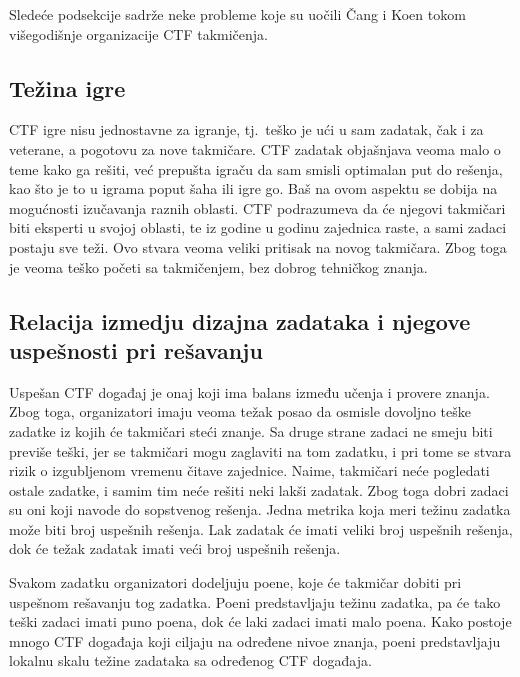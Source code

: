 \documentclass[12pt, a4paper, twocolumn]{article}
\begin{document}
Sledeće podsekcije sadrže neke probleme koje su uočili Čang i Koen 
\cite{ctf_chung} tokom višegodišnje organizacije CTF takmičenja.

\subsection{Težina igre}

CTF igre nisu jednostavne za igranje, tj.\ teško je ući u sam zadatak, čak i
za veterane, a pogotovu za nove takmičare. CTF zadatak objašnjava veoma
malo o teme kako ga rešiti, već prepušta igraču da sam smisli optimalan put
do rešenja, kao što je to u igrama poput šaha ili igre go. Baš na ovom aspektu
se dobija na mogućnosti izučavanja raznih oblasti. CTF podrazumeva da će
njegovi takmičari biti eksperti u svojoj oblasti, te iz godine u godinu
zajednica raste, a sami zadaci postaju sve teži. Ovo stvara veoma veliki 
pritisak na novog takmičara. Zbog toga je veoma teško početi sa takmičenjem,
bez dobrog tehničkog znanja.

\subsection{
    Relacija izmedju dizajna zadataka i njegove uspešnosti pri rešavanju
}

Uspešan CTF događaj je onaj koji ima balans između učenja i provere znanja.
Zbog toga, organizatori imaju veoma težak posao da osmisle dovoljno teške 
zadatke iz kojih će takmičari steći znanje. Sa druge strane zadaci ne
smeju biti previše teški, jer se takmičari mogu zaglaviti na tom zadatku, i
pri tome se stvara rizik o izgubljenom vremenu čitave zajednice. Naime,
takmičari neće pogledati ostale zadatke, i samim tim neće rešiti neki lakši 
zadatak. Zbog toga dobri zadaci su oni koji navode do sopstvenog rešenja.
Jedna metrika koja meri težinu zadatka može biti broj uspešnih rešenja.
Lak zadatak će imati veliki broj uspešnih rešenja, dok će težak zadatak 
imati veći broj uspešnih rešenja.

Svakom zadatku organizatori dodeljuju poene, koje će takmičar dobiti pri
uspešnom rešavanju tog zadatka. Poeni predstavljaju težinu zadatka, pa će tako
teški zadaci imati puno poena, dok će laki zadaci imati malo poena. Kako 
postoje mnogo CTF događaja koji ciljaju na određene nivoe znanja, poeni 
predstavljaju lokalnu skalu težine zadataka sa određenog CTF događaja.
\end{document}
